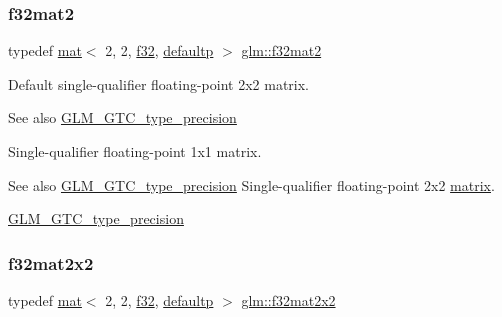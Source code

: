 \subsubsection{\texorpdfstring{f32mat2}{f32mat2}}
{\footnotesize\ttfamily typedef \mbox{\hyperlink{structglm_1_1mat}{mat}}$<$ 2, 2, \mbox{\hyperlink{group__gtc__type__precision_ga0ec999b57f5330d9021256e96038df04}{f32}}, \mbox{\hyperlink{namespaceglm_a36ed105b07c7746804d7fdc7cc90ff25a9d21ccd8b5a009ec7eb7677befc3bf51}{defaultp}} $>$ \mbox{\hyperlink{group__gtc__type__precision_gace6703eef94c05b9985f85759fb113fa}{glm\+::f32mat2}}}

Default single-\/qualifier floating-\/point 2x2 matrix. \begin{DoxySeeAlso}{See also}
\mbox{\hyperlink{group__gtc__type__precision}{G\+L\+M\+\_\+\+G\+T\+C\+\_\+type\+\_\+precision}}
\end{DoxySeeAlso}
Single-\/qualifier floating-\/point 1x1 matrix. \begin{DoxySeeAlso}{See also}
\mbox{\hyperlink{group__gtc__type__precision}{G\+L\+M\+\_\+\+G\+T\+C\+\_\+type\+\_\+precision}} Single-\/qualifier floating-\/point 2x2 \mbox{\hyperlink{_s_d_l__opengl__glext_8h_a7b24a3f2f56eb1244ae69dacb4fecb6f}{matrix}}. 

\mbox{\hyperlink{group__gtc__type__precision}{G\+L\+M\+\_\+\+G\+T\+C\+\_\+type\+\_\+precision}} 
\end{DoxySeeAlso}
\mbox{\label{group__gtc__type__precision_ga3c0ffd3a47ae47ff05d5ea6e90825caa}} 
\subsubsection{\texorpdfstring{f32mat2x2}{f32mat2x2}}
{\footnotesize\ttfamily typedef \mbox{\hyperlink{structglm_1_1mat}{mat}}$<$ 2, 2, \mbox{\hyperlink{group__gtc__type__precision_ga0ec999b57f5330d9021256e96038df04}{f32}}, \mbox{\hyperlink{namespaceglm_a36ed105b07c7746804d7fdc7cc90ff25a9d21ccd8b5a009ec7eb7677befc3bf51}{defaultp}} $>$ \mbox{\hyperlink{group__gtc__type__precision_ga3c0ffd3a47ae47ff05d5ea6e90825caa}{glm\+::f32mat2x2}}}

